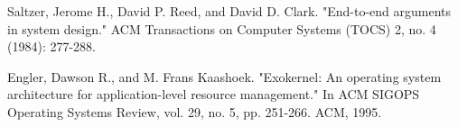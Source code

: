 \documentclass[12pt,a4paper,fleqn]{article}
\begin{document}
\begin{thebibliography}{1}

 Saltzer, Jerome H., David P. Reed, and David D. Clark. "End-to-end arguments in system design." ACM Transactions on Computer Systems (TOCS) 2, no. 4 (1984): 277-288.

 Engler, Dawson R., and M. Frans Kaashoek. "Exokernel: An operating system architecture for application-level resource management." In ACM SIGOPS Operating Systems Review, vol. 29, no. 5, pp. 251-266. ACM, 1995.

\end{thebibliography}
\end{document}
